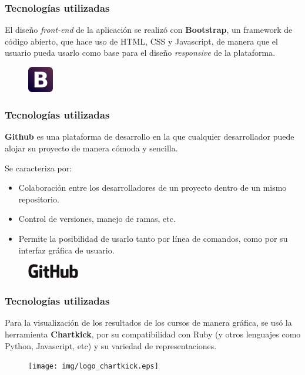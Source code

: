 \documentclass{beamer}
\begin{document}
\begin{frame}
\frametitle{Tecnologías utilizadas}

El diseño \textit{front-end} de la aplicación se realizó con \textbf{Bootstrap}, un framework de código abierto, que hace uso de HTML, CSS y Javascript, de manera que el usuario pueda usarlo como base
para el diseño \textit{responsive} de la plataforma.

\begin{figure}
    \includegraphics[width=0.1\textwidth]{img/logo_bootstrap.eps}
\end{figure}

\end{frame}

\begin{frame}
\frametitle{Tecnologías utilizadas}

\textbf{Github} es una plataforma de desarrollo en la que cualquier desarrollador puede alojar su proyecto de manera cómoda y sencilla.

Se caracteriza por:
\begin{itemize}
    \item Colaboración entre los desarrolladores de un proyecto dentro de un mismo repositorio.
    \item Control de versiones, manejo de ramas, etc.
    \item Permite la posibilidad de usarlo tanto por línea de comandos, como por su interfaz gráfica de usuario.
\end{itemize}

\begin{figure}
    \includegraphics[width=0.2\textwidth]{img/logo_github.eps}
\end{figure}

\end{frame}

\begin{frame}
\frametitle{Tecnologías utilizadas}

Para la visualización de los resultados de los cursos de manera gráfica, se usó la herramienta \textbf{Chartkick}, por su compatibilidad con Ruby (y otros lenguajes como Python, Javascript, etc) y su variedad
de representaciones.

\begin{figure}
    \texttt{[image: img/logo\_chartkick.eps]}
\end{figure}

\end{frame}
\end{document}
